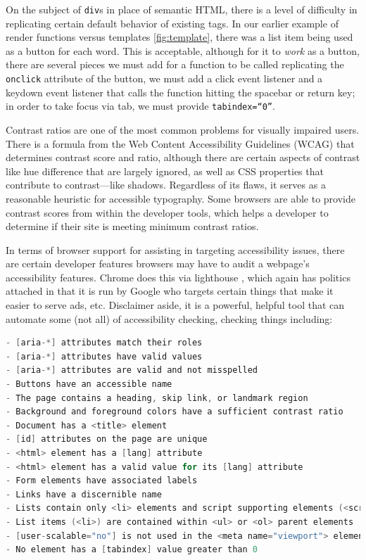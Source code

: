 \documentclass[11pt, twoside, reqno]{book}
\begin{document}
On the subject of \texttt{div}s in place of semantic HTML, there is a level of difficulty in replicating certain default behavior of existing tags. In our earlier example of render functions versus templates \ref{fig:template}, there was a list item being used as a button for each word. This is acceptable, although for it to \textit{work} as a button, there are several pieces we must add for a function to be called replicating the \texttt{onclick} attribute of the button, we must add a click event listener and a keydown event listener that calls the function hitting the spacebar or return key; in order to take focus via tab, we must provide \texttt{tabindex=``0''}.

Contrast ratios are one of the most common problems for visually impaired users. There is a formula from the Web Content Accessibility Guidelines (WCAG) \cite{WebConte88:online} that determines contrast score and ratio, although there are certain aspects of contrast like hue difference that are largely ignored, as well as CSS properties that contribute to contrast—like shadows. Regardless of its flaws, it serves as a reasonable heuristic for accessible typography. Some browsers are able to provide contrast scores from within the developer tools, which helps a developer to determine if their site is meeting minimum contrast ratios.

In terms of browser support for assisting in targeting accessibility issues, there are certain developer features browsers may have to audit a webpage's accessibility features. Chrome does this via lighthouse \cite{Lighthou16:online}, which again has politics attached in that it is run by Google who targets certain things that make it easier to serve ads, etc. Disclaimer aside, it is a powerful, helpful tool that can automate some (not all) of accessibility checking, checking things including:

\begin{lstlisting}[language=C]
- [aria-*] attributes match their roles
- [aria-*] attributes have valid values
- [aria-*] attributes are valid and not misspelled
- Buttons have an accessible name
- The page contains a heading, skip link, or landmark region
- Background and foreground colors have a sufficient contrast ratio
- Document has a <title> element
- [id] attributes on the page are unique
- <html> element has a [lang] attribute
- <html> element has a valid value for its [lang] attribute
- Form elements have associated labels
- Links have a discernible name
- Lists contain only <li> elements and script supporting elements (<script> and - <template>).
- List items (<li>) are contained within <ul> or <ol> parent elements
- [user-scalable="no"] is not used in the <meta name="viewport"> element and the - [maximum-scale] attribute is not less than 5.
- No element has a [tabindex] value greater than 0
\end{lstlisting}
\end{document}
